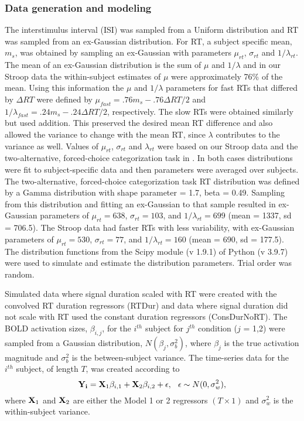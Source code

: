 \documentclass[sn-mathphys,Numbered, super, referee, lineno]{sn-jnl}
\begin{document}
\subsubsection*{Data generation and modeling} 


The interstimulus interval (ISI) was sampled from a Uniform distribution and RT was sampled from an ex-Gaussian distribution.  For RT, a subject specific mean, $m_s$, was obtained by sampling an ex-Gaussian with parameters $\mu_{rt}$, $\sigma_{rt}$ and $1/\lambda_{rt}$.  The mean of an ex-Gaussian distribution is the sum of $\mu$ and $1/\lambda$ and in our Stroop data the within-subject estimates of $\mu$ were approximately 76\% of the mean.  Using this information the $\mu$ and $1/\lambda$ parameters for  fast RTs that differed by $\Delta RT$ were defined by $\mu_{fast} = .76m_s - .76 \Delta RT/2$ and $1/\lambda_{fast} = .24 m_s -.24 \Delta RT/2$, respectively.  The slow RTs were obtained similarly but used addition.  This preserved the desired mean RT difference and also allowed the variance to change with the mean RT, since $\lambda$ contributes to the variance as well.  Values of $\mu_{rt}$, $\sigma_{rt}$ and $\lambda_{rt}$ were based on our Stroop data and the two-alternative, forced-choice categorization task in \citet{grinband_detection_2008}.  In both cases distributions were fit to subject-specific data and then parameters were averaged over subjects.  The two-alternative, forced-choice categorization task RT distribution was defined by a Gamma distribution with shape parameter = 1.7, beta = 0.49.  Sampling from this distribution and fitting an ex-Gaussian to that sample resulted in ex-Gaussian parameters of $\mu_{rt} = 638$, $\sigma_{rt} = 103$, and $1/\lambda_{rt} = 699$ (mean = 1337, sd = 706.5). The Stroop data had faster RTs with less variability, with ex-Gaussian parameters of  $\mu_{rt} =530$, $\sigma_{rt} = 77$, and $1/\lambda_{rt} = 160$ (mean = 690, sd = 177.5).  The distribution functions from the Scipy module (v 1.9.1)  of Python (v 3.9.7) were used to simulate and estimate the distribution parameters. Trial order was  random.
 


Simulated data where signal duration scaled with RT were created with the convolved RT duration regressors (RTDur) and data where signal duration did not scale with RT used the constant duration regressors (ConsDurNoRT).  The BOLD activation sizes, $\beta_{i,j}$, for the $i^{th}$ subject for $j^{th}$ condition ($j$ = 1,2)  were  sampled from a Gaussian distribution, $N(\beta_j, \sigma_b^2)$,  where $\beta_j$ is the true activation magnitude and $\sigma^2_b$ is the between-subject variance.  The time-series data for the $i^{th}$ subject, of length $T$, was created according to 
\begin{equation} \label{eq:timeseries}
   \vb{Y_i} = \vb{X}_{1}\beta_{i, 1}  +  \vb{X}_{2}\beta_{i, 2} + \epsilon, \hspace{.1in} \epsilon \sim N(0, \sigma^2_w), 
\end{equation}
where $\vb{X}_{1}$ and $\vb{X}_{2}$  are either the Model 1 or 2 regressors $(T\times 1)$  and $\sigma^2_w$ is the within-subject variance.  
\end{document}
